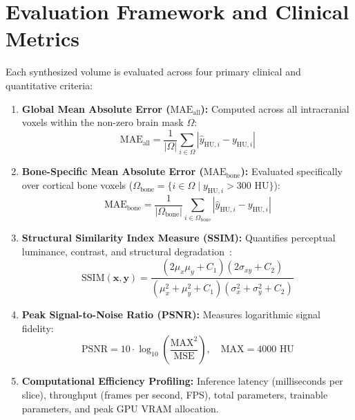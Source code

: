 \section{Evaluation Framework and Clinical Metrics}
Each synthesized volume is evaluated across four primary clinical and quantitative criteria:
\begin{enumerate}[label=\textbf{(\arabic*)}]
    \item \textbf{Global Mean Absolute Error ($\text{MAE}_{\text{all}}$):} Computed across all intracranial voxels within the non-zero brain mask $\Omega$:
    \begin{equation}
    \text{MAE}_{\text{all}} = \frac{1}{|\Omega|} \sum_{i \in \Omega} |\hat{y}_{\text{HU}, i} - y_{\text{HU}, i}|
    \label{eq:mae_all}
    \end{equation}
    \item \textbf{Bone-Specific Mean Absolute Error ($\text{MAE}_{\text{bone}}$):} Evaluated specifically over cortical bone voxels ($\Omega_{\text{bone}} = \{i \in \Omega \mid y_{\text{HU}, i} > 300\text{ HU}\}$):
    \begin{equation}
    \text{MAE}_{\text{bone}} = \frac{1}{|\Omega_{\text{bone}}|} \sum_{i \in \Omega_{\text{bone}}} |\hat{y}_{\text{HU}, i} - y_{\text{HU}, i}|
    \label{eq:mae_bone}
    \end{equation}
    \item \textbf{Structural Similarity Index Measure (SSIM):} Quantifies perceptual luminance, contrast, and structural degradation~\cite{wang2004image}:
    \begin{equation}
    \text{SSIM}(\mathbf{x}, \mathbf{y}) = \frac{(2\mu_x\mu_y + C_1)(2\sigma_{xy} + C_2)}{(\mu_x^2 + \mu_y^2 + C_1)(\sigma_x^2 + \sigma_y^2 + C_2)}
    \label{eq:ssim_metric}
    \end{equation}
    \item \textbf{Peak Signal-to-Noise Ratio (PSNR):} Measures logarithmic signal fidelity:
    \begin{equation}
    \text{PSNR} = 10 \cdot \log_{10} \left( \frac{\text{MAX}^2}{\text{MSE}} \right), \quad \text{MAX} = 4000\text{ HU}
    \label{eq:psnr_metric}
    \end{equation}
    \item \textbf{Computational Efficiency Profiling:} Inference latency (milliseconds per slice), throughput (frames per second, FPS), total parameters, trainable parameters, and peak GPU VRAM allocation.
\end{enumerate}
